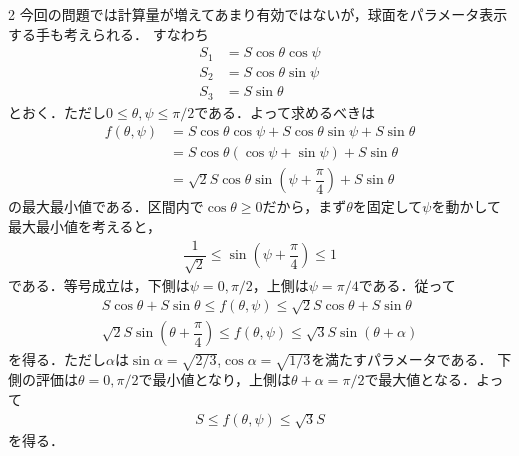 \documentclass[../../main.tex]{subfiles}
\begin{document}
\begin{multicols}{2}
  今回の問題では計算量が増えてあまり有効ではないが，球面をパラメータ表示する手も考えられる．
  すなわち
  \begin{align}
    S_1 & = S\cos\theta\cos\psi \\
    S_2 & = S\cos\theta\sin\psi \\
    S_3 & = S\sin\theta
  \end{align}
  とおく．ただし$0\le\theta,\psi\le\pi/2$である．よって求めるべきは
  \begin{align}
    f(\theta,\psi)
    & = S\cos\theta\cos\psi+S\cos\theta\sin\psi+S\sin\theta                  \\
    & = S\cos\theta\left(\cos\psi+\sin\psi\right)+S\sin\theta                \\
    & = \sqrt{2}S\cos\theta\sin\left(\psi+\dfrac{\pi}{4}\right) + S\sin\theta
  \end{align}
  の最大最小値である．区間内で$\cos\theta\ge 0$だから，まず$\theta$を固定して$\psi$を動かして
  最大最小値を考えると，
  \begin{align}
    \dfrac{1}{\sqrt{2}} \le \sin\left(\psi+\dfrac{\pi}{4}\right) \le 1
  \end{align}
  である．等号成立は，下側は$\psi=0,\pi/2$，上側は$\psi=\pi/4$である．従って
  \begin{align}
    S\cos\theta + S\sin\theta \le f(\theta,\psi) \le \sqrt{2}S\cos\theta + S\sin\theta \\
    \sqrt{2}S\sin\left(\theta+\dfrac{\pi}{4}\right) \le f(\theta,\psi) \le \sqrt{3}S\sin(\theta+\alpha)
  \end{align}
  を得る．ただし$\alpha$は$\sin\alpha=\sqrt{2/3}$,$\cos\alpha=\sqrt{1/3}$を満たすパラメータである．
  下側の評価は$\theta=0,\pi/2$で最小値となり，上側は$\theta+\alpha=\pi/2$で最大値となる．よって
  \begin{align}
    S \le f(\theta,\psi) \le \sqrt{3} S
  \end{align}
  を得る．

  \newpage
\end{multicols}
\end{document}
